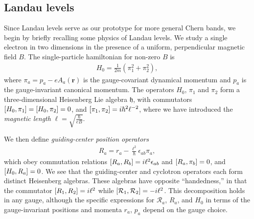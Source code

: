 \documentclass[aps,prb,twocolumn,letterpaper,twoside,nobalancelastpage,groupedaddress,amsmath,amssymb,floatfix,citeautoscript]{revtex4-1}
\begin{document}
\subsection{Landau levels}
\label{landau-level-review}
Since Landau levels serve as our prototype for more general Chern bands, we begin by briefly recalling some physics of Landau levels\cite{yoshioka_quantum_2002}. We study a single electron in two dimensions in the presence of a uniform, perpendicular magnetic field $B$. The single-particle hamiltonian for non-zero $B$ is
\begin{align}
\label{landau-hamiltonian}
H_0 = \frac{1}{2m}\left(\pi_1^2 + \pi_2^2\right),
\end{align}
where $\pi_a = p_a - e A_a(\mathbf{r})$ is the gauge-covariant dynamical momentum and $p_a$ is the gauge-invariant canonical momentum. The operators $H_0$, $\pi_1$ and $\pi_2$ form a three-dimensional Heisenberg Lie algebra $\mathfrak{h}$, with commutators $\comm{H_0}{\pi_1} = \comm{H_0}{\pi_2} = 0$, and $\comm{\pi_1}{\pi_2} = i\hbar^2\ell^{-2}$, where we have introduced the \textit{magnetic length} $\ell = \sqrt{\frac{\hbar}{eB}}.$


We then define \textit{guiding-center position operators}
\begin{align*}
R_a = r_a - \frac{\ell^2}{\hbar}\epsilon_{ab}\pi_a,
\end{align*}
which obey commutation relations $\comm{R_a}{R_b} = i\ell^2 \epsilon_{ab}$ and $\comm{R_a}{\pi_b} = 0$, and $\comm{H_0}{R_a} = 0$. We see that the guiding-center and cyclotron operators each form distinct Heisenberg algebras. These algebras have opposite ``handedness,'' in that the commutator $\comm{R_1}{R_2} = i\ell^2$ while $\comm{\mathcal{R}_1}{\mathcal{R}_2} = -i\ell^2$. This decomposition holds in any gauge, although the specific expressions for $\mathcal{R}_a$, $R_a$, and $H_0$ in terms of the gauge-invariant positions and momenta $r_a$, $p_a$ depend on the gauge choice.
\end{document}
